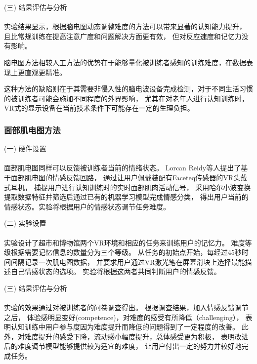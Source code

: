 \documentclass{article}
\begin{document}
            (三) 结果评估与分析\paragraph{}
            实验结果显示，根据脑电图动态调整难度的方法可以带来显著的认知能力提升，
            且比常规训练在提高注意广度和问题解决方面更有效，
            但对反应速度和记忆力没有影响。

            脑电图方法相较人工方法的优势在于能够量化被训练者感知的训练难度，在数据表现上更直观更精准。

            这种方法的缺陷则在于其需要非侵入性的脑电波设备完成检测，对于不同生活习惯的被训练者可能会施加不同程度的外界影响，
            尤其在对老年人进行认知训练时，VR式的显示设备在当前技术条件下可能存在一定的生理负担。


            \subsubsection{面部肌电图方法}
            (一) 硬件设置\paragraph{}
            面部肌电图同样可以反馈被训练者当前的情绪状态。
            Lorcan Reidy等人提出了基于面部肌电图的情感反馈回路，
            通过让用户佩戴装配有Faceteq传感器的VR头戴式耳机，
            捕捉用户进行认知训练时的实时面部肌肉活动信号，
            采用哈尔小波变换提取数据特征并筛选后通过已有的机器学习模型完成情感分类，
            得出用户当前的情感状态。实验将根据用户的情感状态调节任务难度。

            (二) 实验设置\paragraph{}
            实验设计了超市和博物馆两个VR环境和相应的任务来训练用户的记忆力。
            难度等级根据需要记忆信息的数量分为三个等级。
            从任务的初始点开始，每经过45秒时间间隔记录一次肌电图数据，
            并要求用户通过VR激光笔在屏幕滑块上选择最能描述自己情感状态的选项。
            实验将根据这两者共同判断用户的情感反馈。

            (三) 结果评估与分析\paragraph{}
            实验的效果通过对被训练者的问卷调查得出。
            根据调查结果，加入情感反馈调节之后，
            体验感明显变好(competence)，对难度的感受有所降低（challenging），
            表明认知训练中用户参与度因为难度提升而降低的问题得到了一定程度的改善。
            此外，对难度提升的感受下降，流动感小幅度提升，总体感受更为积极，
            表明改进后的难度调节模型能够提供较为适宜的难度，
            让用户付出一定的努力并较好地完成任务。
\end{document}
